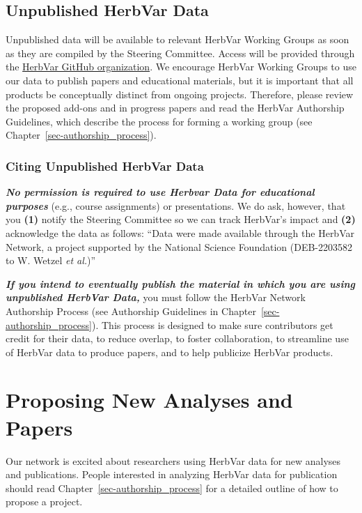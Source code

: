 \documentclass[
  letterpaper,
  oneside,
  open=any]{scrbook}
\begin{document}
\section{Unpublished HerbVar Data}\label{unpublished-herbvar-data}

Unpublished data will be available to relevant HerbVar Working Groups as
soon as they are compiled by the Steering Committee. Access will be
provided through the \href{https://github.com/HerbVar-Network}{HerbVar
GitHub organization}. We encourage HerbVar Working Groups to use our
data to publish papers and educational materials, but it is important
that all products be conceptually distinct from ongoing projects.
Therefore, please review the proposed add-ons and in progress papers and
read the HerbVar Authorship Guidelines, which describe the process for
forming a working group (see Chapter~\ref{sec-authorship_process}).

\subsection{Citing Unpublished HerbVar
Data}\label{citing-unpublished-herbvar-data}

\textbf{\emph{No permission is required to use Herbvar Data for
educational purposes}} (e.g., course assignments) or presentations. We
do ask, however, that you \textbf{(1)} notify the Steering Committee so
we can track HerbVar's impact and \textbf{(2)} acknowledge the data as
follows: ``Data were made available through the HerbVar Network, a
project supported by the National Science Foundation (DEB-2203582 to W.
Wetzel \emph{et al.})''

\textbf{\emph{If you intend to eventually publish the material in which
you are using unpublished HerbVar Data, }}you must follow the HerbVar
Network Authorship Process (see Authorship Guidelines in
Chapter~\ref{sec-authorship_process}). This process is designed to make
sure contributors get credit for their data, to reduce overlap, to
foster collaboration, to streamline use of HerbVar data to produce
papers, and to help publicize HerbVar products.

\chapter{Proposing New Analyses and Papers}\label{sec-new_analyses}

Our network is excited about researchers using HerbVar data for new
analyses and publications. People interested in analyzing HerbVar data
for publication should read Chapter~\ref{sec-authorship_process} for a
detailed outline of how to propose a project.
\end{document}
